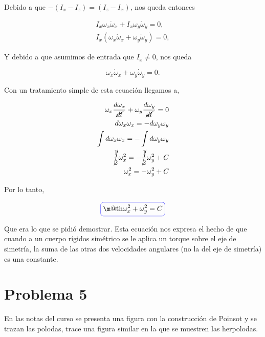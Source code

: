 \documentclass[a4paper,10pt]{article}
\makeatletter
\numberwithin{equation}{section}
\newcommand*{\boxcolor}{blue}
\renewcommand{\boxed}[1]{\textcolor{\boxcolor}{%
\tikz[baseline={([yshift=-1ex]current bounding box.center)}] \node [rectangle, minimum width=1ex,rounded corners,draw] {\normalcolor\m@th$\displaystyle#1$};}}
\makeatother
\begin{document}
Debido a que $-(I_x - I_z) = (I_z - I_x)$, nos queda entonces 

\begin{align*}
 I_x \omega_x \dot{\omega}_x + I_x \omega_y \dot{\omega}_y = 0, \\
 I_x (\omega_x \dot{\omega}_x + \omega_y \dot{\omega}_y) = 0,
\end{align*}

Y debido a que asumimos de entrada que $I_x \ne 0$, nos queda 

\begin{equation}
 \omega_x \dot{\omega}_x + \omega_y \dot{\omega}_y = 0.
\end{equation}

Con un tratamiento simple de esta ecuación llegamos a,

\begin{align}
\begin{split}
\omega_x \frac{d\omega_x}{\cancel{dt}} + \omega_y \frac{d\omega_y}{\cancel{dt}} = 0 \\
%
d\omega_x \omega_x = - d\omega_y \omega_y \\
%
\int d\omega_x \omega_x = - \int d\omega_y \omega_y \\
%
\cancel{\frac{1}{2}} \omega_x^2 = - \cancel{\frac{1}{2}} \omega_y^2 + C \\
%
 \omega_x^2 = - \omega_y^2 + C
%
\end{split}
\end{align}

Por lo tanto,

\begin{equation}
 \boxed{\omega_x^2 + \omega_y^2 = C}
\end{equation}

Que era lo que se pidió demostrar. Esta ecuación nos expresa el hecho de que cuando 
a un cuerpo rígidos simétrico se le aplica un torque sobre el eje de simetría, la suma de las
otras dos velocidades angulares (no la del eje de simetría) es una constante.


\section{Problema 5}

En las notas del curso se presenta una figura con la construcción de Poinsot y se 
trazan las polodas, trace una figura similar en la que se muestren las herpolodas.

\vspace{.3cm}
\end{document}
